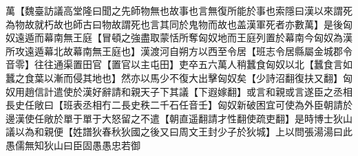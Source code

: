 萬【魏臺訪議高堂隆曰聞之先師物無也故事也言無復所能於事也索隱曰漢以來謂死為物故就朽故也師古曰物故謂死也言其同於鬼物而故也盖漢軍死者亦數萬】是後匈奴遠遁而幕南無王庭【冒頓之強盡取蒙恬所奪匈奴地而王庭列置於幕南今匈奴為漢所攻遠遁幕北故幕南無王庭也】漢渡河自朔方以西至令居【班志令居縣屬金城郡令音零】往往通渠置田官【置官以主屯田】吏卒五六萬人稍蠶食匈奴以北【蠶食言如蠶之食葉以漸而侵其地也】然亦以馬少不復大出擊匈奴矣【少詩沼翻復扶又翻】匈奴用趙信計遣使於漢好辭請和親天子下其議【下遐嫁翻】或言和親或言遂臣之丞相長史任敞曰【班表丞相冇二長史秩二千石任音壬】匈奴新破困宜可使為外臣朝請於邊漢使任敞於單于單于大怒留之不遣【朝直遥翻請才性翻使疏吏翻】是時博士狄山議以為和親便【姓譜狄春秋狄國之後又曰周文王封少子於狄城】上以問張湯湯曰此愚儒無知狄山曰臣固愚愚忠若御